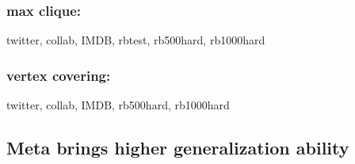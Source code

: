 











\iffalse
\subsubsection{max clique:} twitter, collab, IMDB, rbtest, rb500hard, rb1000hard
\subsubsection{vertex covering:} twitter, collab, IMDB, rb500hard, rb1000hard
\subsection{Meta brings higher generalization ability}
